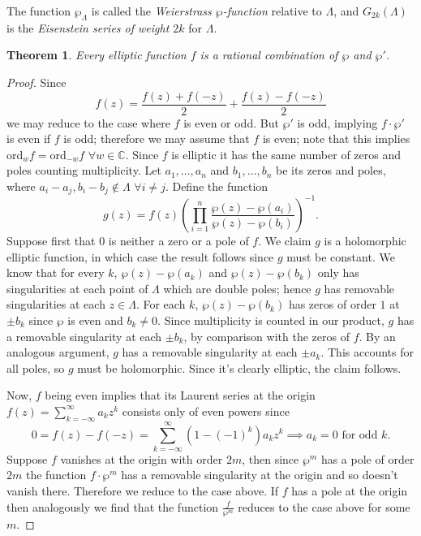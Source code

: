 \documentclass{article}
\newtheorem{theorem}{Theorem}
\theoremstyle{remark}
\begin{document}
The function $\wp _\Lambda$ is called the \textit{Weierstrass $\wp$-function} relative to $\Lambda$, and $G_{2k}(\Lambda)$ is the \textit{Eisenstein series of weight $2k$} for $\Lambda$.

\begin{theorem}
Every elliptic function $f$ is a rational combination of $\wp$ and $\wp'$.
\end{theorem}
\begin{proof}
Since
\[f(z)=\frac{f(z)+f(-z)}{2}+\frac{f(z)-f(-z)}{2} \]
we may reduce to the case where $f$ is even or odd. But $\wp'$ is odd, implying $f\cdot\wp'$ is even if $f$ is odd; therefore we may assume that $f$ is even; note that this implies ord$_wf=$ord$_{-w}f$ $\forall w\in\mathbb{C}$. Since $f$ is elliptic it has the same number of zeros and poles counting multiplicity. Let $a_1,\ldots,a_n$ and $b_1,\ldots, b_n$ be its zeros and poles, where $a_i-a_j,b_i-b_j\not \in\Lambda$ $\forall i\neq j$. Define the function
\[g(z)=f(z)\left( \prod_{i=1}^n  \frac{\wp(z)-\wp(a_i)}{\wp(z)-\wp(b_i)} \right )^{-1}.  \]
Suppose first that $0$ is neither a zero or a pole of $f$. We claim $g$ is a holomorphic elliptic function, in which case the result follows since $g$ must be constant. We know that for every $k$, $\wp(z)-\wp(a_k)$ and $\wp(z)-\wp(b_k)$ only has singularities at each point of $\Lambda$ which are double poles; hence $g$ has removable singularities at each $z\in\Lambda$. For each $k$, $\wp(z)-\wp(b_k)$ has zeros of order $1$ at $\pm b_k$ since $\wp$ is even and $b_k\neq 0$. Since multiplicity is counted in our product, $g$ has a removable singularity at each $\pm b_k$, by comparison with the zeros of $f$. By an analogous argument, $g$ has a removable singularity at each $\pm a_k$. This accounts for all poles, so $g$ must be holomorphic. Since it's clearly elliptic, the claim follows.

Now, $f$ being even implies that its Laurent series at the origin $f(z)=\sum_{k=-\infty}^{\infty}a_k z^k$ consists only of even powers since
\[0=f(z)-f(-z)=\sum_{k=-\infty}^{\infty}(1-(-1)^k)a_k z^k\implies a_k=0 \text{ for odd }k. \]
Suppose $f$ vanishes at the origin with order $2m$, then since $\wp^m$ has a pole of order $2m$ the function $f\cdot\wp^m$ has a removable singularity at the origin and so doesn't vanish there. Therefore we reduce to the case above. If $f$ has a pole at the origin then analogously we find that the function $\frac{f}{\wp^m}$ reduces to the case above for some $m$.
\end{proof}
\end{document}
